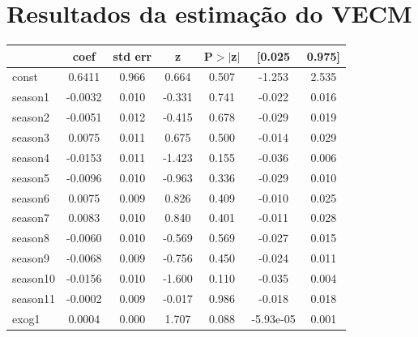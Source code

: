 \documentclass[a4paper,
               article,
               12pt,
               openany,
               oneside,
               english,
               brazil]{abntex2}
\numberwithin{equation}{section}
\begin{document}
\clearpage
\printbibliography

\clearpage
\apendices
\chapter{Resultados da estimação do VECM}
\begin{longtable}{lcccccc}
    \toprule
    & coef & std err & z & P$> |$z$|$ & [0.025 & 0.975]  \\
    \midrule
    const     &       0.6411  &        0.966     &     0.664  &         0.507        &       -1.253    &        2.535     \\
    season1   &      -0.0032  &        0.010     &    -0.331  &         0.741        &       -0.022    &        0.016     \\
    season2   &      -0.0051  &        0.012     &    -0.415  &         0.678        &       -0.029    &        0.019     \\
    season3   &       0.0075  &        0.011     &     0.675  &         0.500        &       -0.014    &        0.029     \\
    season4   &      -0.0153  &        0.011     &    -1.423  &         0.155        &       -0.036    &        0.006     \\
    season5   &      -0.0096  &        0.010     &    -0.963  &         0.336        &       -0.029    &        0.010     \\
    season6   &       0.0075  &        0.009     &     0.826  &         0.409        &       -0.010    &        0.025     \\
    season7   &       0.0083  &        0.010     &     0.840  &         0.401        &       -0.011    &        0.028     \\
    season8   &      -0.0060  &        0.010     &    -0.569  &         0.569        &       -0.027    &        0.015     \\
    season9   &      -0.0068  &        0.009     &    -0.756  &         0.450        &       -0.024    &        0.011     \\
    season10  &      -0.0156  &        0.010     &    -1.600  &         0.110        &       -0.035    &        0.004     \\
    season11  &      -0.0002  &        0.009     &    -0.017  &         0.986        &       -0.018    &        0.018     \\
    exog1     &       0.0004  &        0.000     &     1.707  &         0.088        &    -5.93e-05    &        0.001     \\

\end{longtable}
\end{document}
